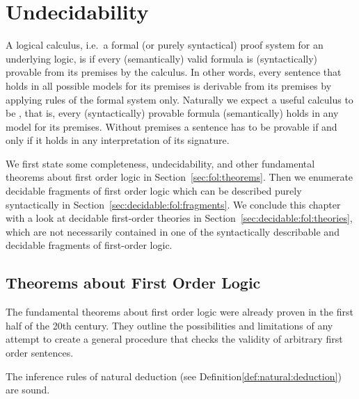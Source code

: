 

\chapter{Undecidability}

A logical calculus, i.e.~a formal (or purely syntactical) proof system for an underlying logic,
is  if every (semantically) valid formula is (syntactically) 
provable from its premises by the calculus.
In other words, every sentence that holds in all possible models for its premises
is derivable from its premises by applying rules of the formal system only.
Naturally we expect a useful calculus to be , that is,
every (syntactically) provable formula (semantically) holds in any model for its premises.
Without premises a sentence has to be provable if and only if it holds in any interpretation of its signature.




We first state some completeness, undecidability, and other
fundamental theorems about first order logic
in Section~\vref{sec:fol:theorems}.
Then we enumerate decidable fragments of first order logic
which can be described purely syntactically
in Section~\vref{sec:decidable:fol:fragments}.
We conclude this chapter with a look at decidable first-order theories
in Section~\vref{sec:decidable:fol:theories},
which are not necessarily contained
in one of the syntactically describable and decidable fragments of first-order logic.


\section{Theorems about First Order Logic}\label{sec:fol:theorems}

The fundamental theorems about first order logic
were already proven in the first half of the 20th century.
They outline the possibilities and limitations of any attempt
to create a general procedure that checks the validity of arbitrary first order sentences.

\begin{theorem}[Soundness]
	The inference rules of natural deduction (see Definition\vref{def:natural:deduction}) are sound.
\end{theorem}

